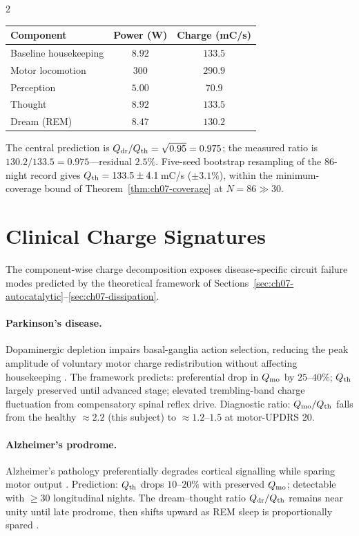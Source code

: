 \begin{multicols}{2}
\begin{center}
\begin{tabular}{lcc}
\toprule
Component & Power (W) & Charge (mC/s)\\
\midrule
Baseline housekeeping & $8.92$ & $133.5$\\
Motor locomotion      & $300$  & $290.9$\\
Perception            & $5.00$ & $70.9$\\
Thought               & $8.92$ & $133.5$\\
Dream (REM)           & $8.47$ & $130.2$\\
\bottomrule
\end{tabular}
\end{center}

The central prediction is $Q_{\mathrm{dr}}/Q_{\mathrm{th}} = \sqrt{0.95} = 0.975$; the measured
ratio is $130.2/133.5 = 0.975$---residual $2.5\%$.  Five-seed bootstrap
resampling of the 86-night record gives $Q_{\mathrm{th}} = 133.5 \pm 4.1$\,mC/s
($\pm 3.1\%$), within the minimum-coverage bound of
Theorem~\ref{thm:ch07-coverage} at $N = 86 \gg 30$.

\section{Clinical Charge Signatures}
\label{sec:ch07-clinical}

The component-wise charge decomposition exposes disease-specific circuit
failure modes predicted by the theoretical framework of
Sections~\ref{sec:ch07-autocatalytic}--\ref{sec:ch07-dissipation}.

\paragraph{Parkinson's disease.}
Dopaminergic depletion impairs basal-ganglia action selection, reducing the
peak amplitude of voluntary motor charge redistribution without affecting
housekeeping \citep{jankovic2008}.  The framework predicts: preferential
drop in $Q_{\mathrm{mo}}$ by $25$--$40\%$; $Q_{\mathrm{th}}$ largely preserved until advanced
stage; elevated trembling-band charge fluctuation from compensatory spinal
reflex drive.  Diagnostic ratio: $Q_{\mathrm{mo}}/Q_{\mathrm{th}}$ falls from the healthy
$\approx 2.2$ (this subject) to $\approx 1.2$--$1.5$ at motor-UPDRS 20.

\paragraph{Alzheimer's prodrome.}
Alzheimer's pathology preferentially degrades cortical signalling while
sparing motor output \citep{selkoe2002,bateman2012}.  Prediction: $Q_{\mathrm{th}}$
drops $10$--$20\%$ with preserved $Q_{\mathrm{mo}}$; detectable with $\ge 30$
longitudinal nights.  The dream--thought ratio $Q_{\mathrm{dr}}/Q_{\mathrm{th}}$ remains near
unity until late prodrome, then shifts upward as REM sleep is
proportionally spared \citep{mander2015}.


\end{multicols}
